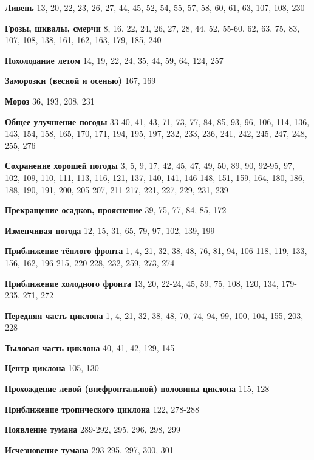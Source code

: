 \textbf{Ливень} 13, 20, 22, 23, 26, 27, 44, 45, 52, 54, 55, 57, 58,
60, 61, 63, 107, 108, 230

\textbf{Грозы,
  шквалы,
  смерчи} 8, 16, 22, 24, 26, 27, 28, 44, 52,
55-60, 62, 63, 75, 83, 107, 108, 138, 161, 162, 163, 179, 185, 240

\textbf{Похолодание летом} 14, 19, 22, 24, 35, 44, 59, 64, 124, 257

\textbf{Заморозки (весной и осенью)} 167, 169

\textbf{Мороз} 36, 193, 208, 231

\textbf{Общее улучшение погоды} 33-40, 41, 43, 71, 73, 77, 84, 85, 93,
96, 106, 114, 136, 143, 154, 158, 165, 170, 171, 194, 195, 197, 232,
233, 236, 241, 242, 245, 247, 248, 255, 276

\textbf{Сохранение хорошей погоды} 3, 5, 9, 17, 42, 45, 47, 49, 50,
89, 90, 92-95, 97, 102, 109, 110, 111, 113, 116, 121, 137, 140, 141,
146-148, 151, 159, 164, 180, 186, 188, 190, 191, 200, 205-207,
211-217, 221, 227, 229, 231, 239

\textbf{Прекращение осадков, прояснение} 39, 75, 77, 84, 85, 172

\textbf{Изменчивая погода} 12, 15, 31, 65, 79, 97, 102, 139, 199

\textbf{Приближение тёплого фронта} 1, 4, 21, 32, 38, 48, 76, 81, 94,
106-118, 119, 133, 156, 162, 196-215, 220-228, 232, 259, 273, 274

\textbf{Приближение холодного фронта} 13, 20, 22-24, 45, 59, 75, 108,
120, 134, 179-235, 271, 272

\textbf{Передняя часть циклона} 1, 4, 21, 32, 38, 48, 70, 74, 94, 99,
100, 104, 155, 203, 228

\textbf{Тыловая часть циклона} 40, 41, 42, 129, 145

\textbf{Центр циклона} 105, 130

\textbf{Прохождение левой (внефронтальной) половины циклона} 115, 128

\textbf{Приближение тропического циклона} 122, 278-288

\textbf{Появление тумана} 289-292, 295, 296, 298, 299

\textbf{Исчезновение тумана} 293-295, 297, 300, 301

